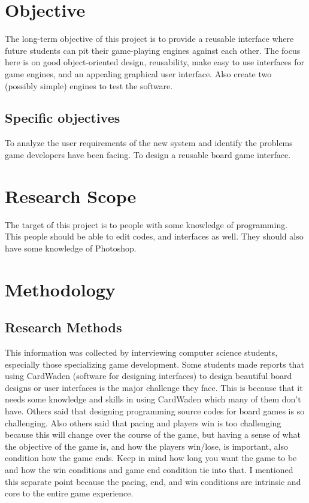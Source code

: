 \documentclass[a4paper,10pt]{article}
\begin{document}
\section{Objective}
The long-term objective of this project is to provide a reusable interface where future students can pit their game-playing engines against each other. The focus here is on good object-oriented design, reusability, make easy to use interfaces for game engines, and an appealing graphical user interface. Also create two (possibly simple) engines to test the software.
\subsection{Specific objectives}
To analyze the user requirements of the new system and identify the problems game developers have been facing. 
To design a reusable board game interface. 
\section{Research Scope}
The target of this project is to people with some knowledge of programming. 
This people should be able to edit codes, and interfaces as well. 
They should also have some knowledge of Photoshop.
\section{Methodology}
\subsection{Research Methods}
This information was collected by interviewing computer science students, especially those specializing game development. Some students made reports that using CardWaden (software for designing interfaces) to design beautiful board designs or user interfaces is the major challenge they face. This is because that it needs some knowledge and skills in using CardWaden which many of them don’t have. Others said that designing programming source codes for board games is so challenging.  Also others said that pacing and players win is too challenging because this will change over the course of the game, but having a sense of what the objective of the game is, and how the players win/lose, is important, also condition how the game ends. Keep in mind how long you want the game to be and how the win conditions and game end condition tie into that. I mentioned this separate point because the pacing, end, and win conditions are intrinsic and core to the entire game experience.
\begin{thebibliography}{1}
\end{thebibliography}
\end{document}

